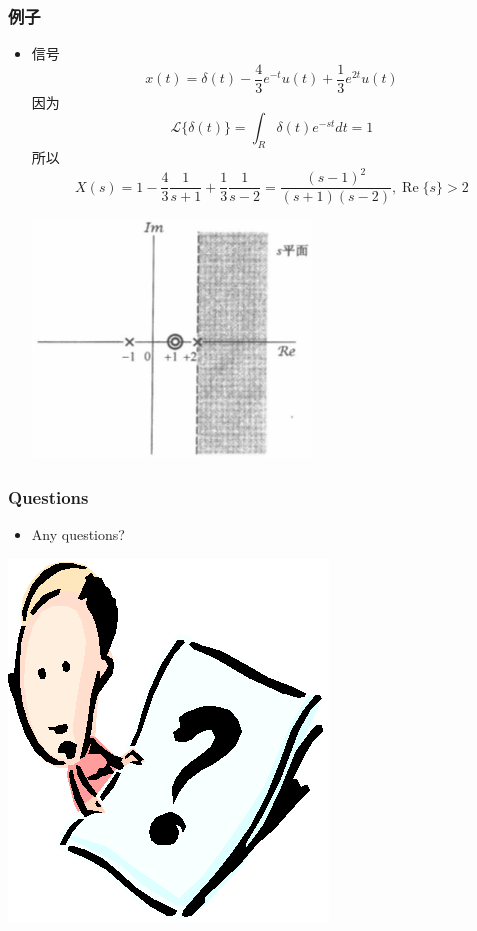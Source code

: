 \documentclass[CJKutf8,dvipsnames,table]{beamer}
\begin{document}
\begin{CJK*}{UTF8}{song}
  \begin{frame}
    \frametitle{例子}
    \begin{itemize}
	\item 信号
	\[
		x(t) = \delta(t) - \frac{4}{3}e^{-t}u(t)+\frac{1}{3}e^{2t}u(t)
	\]
	因为
	\[
		\mathscr{L}\{\delta(t)\} = \int_R \delta(t)e^{-st} dt = 1
	\]
	所以
	\[
	   	X(s)  = 1 - \frac{4}{3}\frac{1}{s+1} + \frac{1}{3}\frac{1}{s-2} = \frac{(s-1)^2}{(s+1)(s-2)}, \operatorname{Re}\{s\} > 2
	\]
		\begin{center}
    	\includegraphics[scale=.47]{ss-c-f9-3}
    	\end{center}
    \end{itemize}
  \end{frame}  
                  
  \begin{frame}
    \frametitle{Questions}
    \begin{itemize}
    \item Any questions?
    \end{itemize}
    \begin{center}
      \includegraphics[scale=.5]{question}
    \end{center}
  \end{frame} 
  

\end{CJK*}
\end{document}
